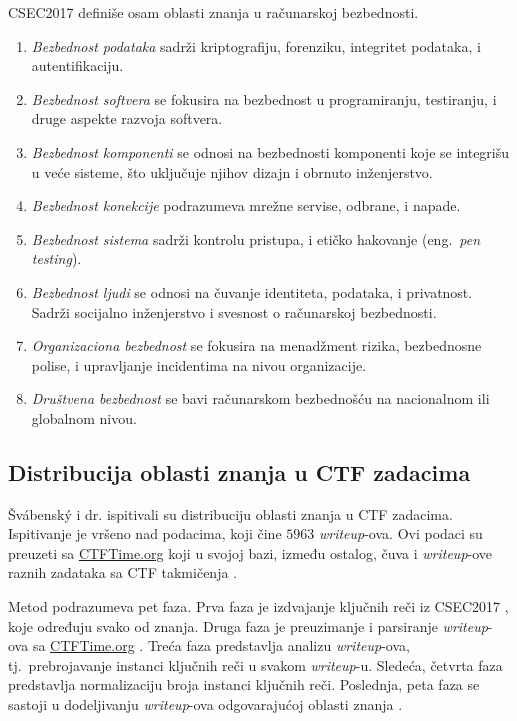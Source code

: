 \documentclass[12pt, a4paper, twocolumn]{article}
\begin{document}
CSEC2017 definiše osam oblasti znanja u računarskoj bezbednosti.
\begin{enumerate}
    \item \emph{Bezbednost podataka} sadrži kriptografiju, forenziku, 
        integritet podataka, i autentifikaciju.
    \item \emph{Bezbednost softvera} se fokusira na bezbednost u 
        programiranju, testiranju, i druge aspekte razvoja softvera.
    \item \emph{Bezbednost komponenti} se odnosi na bezbednosti komponenti 
        koje se integrišu u veće sisteme, što uključuje njihov dizajn i 
        obrnuto inženjerstvo.
    \item \emph{Bezbednost konekcije} podrazumeva mrežne servise, odbrane, i 
        napade.
    \item \emph{Bezbednost sistema} sadrži kontrolu pristupa, i etičko 
        hakovanje (eng.\ \emph{pen testing}).
    \item \emph{Bezbednost ljudi} se odnosi na čuvanje identiteta, podataka, 
        i privatnost. Sadrži socijalno inženjerstvo i svesnost o računarskoj 
        bezbednosti.
    \item \emph{Organizaciona bezbednost} se fokusira na menadžment rizika, 
        bezbednosne polise, i upravljanje incidentima na nivou organizacije.
    \item \emph{Društvena bezbednost} se bavi računarskom bezbednošću 
        na nacionalnom ili globalnom nivou.
\end{enumerate}

\subsection{Distribucija oblasti znanja u CTF zadacima}

Švábenský i dr.\cite{ctf_skills} ispitivali su distribuciju oblasti znanja u 
CTF zadacima. Ispitivanje je vršeno nad podacima, koji čine $5963$ 
\emph{writeup}-ova. Ovi podaci su preuzeti sa \url{CTFTime.org} koji u svojoj 
bazi, između ostalog, čuva i \emph{writeup}-ove raznih zadataka sa CTF 
takmičenja \cite{ctf_time}.

Metod podrazumeva pet faza. Prva faza je izdvajanje ključnih reči iz CSEC2017
\cite{ctf_csec}, koje određuju svako od znanja. Druga faza je preuzimanje i 
parsiranje \emph{writeup}-ova sa \url{CTFTime.org} \cite{ctf_time}. Treća faza 
predstavlja analizu \emph{writeup}-ova, tj.\ prebrojavanje instanci ključnih 
reči u svakom \emph{writeup}-u. Sledeća, četvrta faza predstavlja normalizaciju 
broja instanci ključnih reči. Poslednja, peta faza se sastoji u dodeljivanju 
\emph{writeup}-ova odgovarajućoj oblasti znanja \cite{ctf_skills}. 
\end{document}
